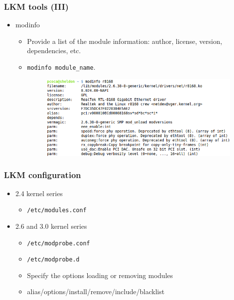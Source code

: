 \documentclass{beamer}
\begin{document}
\begin{frame}
\frametitle{LKM tools (III)}

\begin{itemize}

\item modinfo
   \begin{itemize}
   \item Provide a list of the module information: author, license, version, dependencies, etc.
   \item \texttt{modinfo module\_name}.

\begin{figure}
  \centering
	\includegraphics[scale=0.35,clip=true]{figs/modinfo_screenshot.png}
  \label{fig:modinfo_screenshot}
\end{figure}

   \end{itemize}

\end{itemize}

\end{frame}


\begin{frame}
\frametitle{LKM configuration}

\begin{itemize}

\item 2.4 kernel series 
   \begin{itemize}
   \item \texttt{/etc/modules.conf}
   \end{itemize}

\item 2.6 and 3.0 kernel series 
   \begin{itemize}
   \item \texttt{/etc/modprobe.conf}
   \item \texttt{/etc/modprobe.d}
   \item Specify the options loading or removing modules
   \item alias/options/install/remove/include/blacklist
   \end{itemize}

\end{itemize}

\end{frame}
\end{document}
